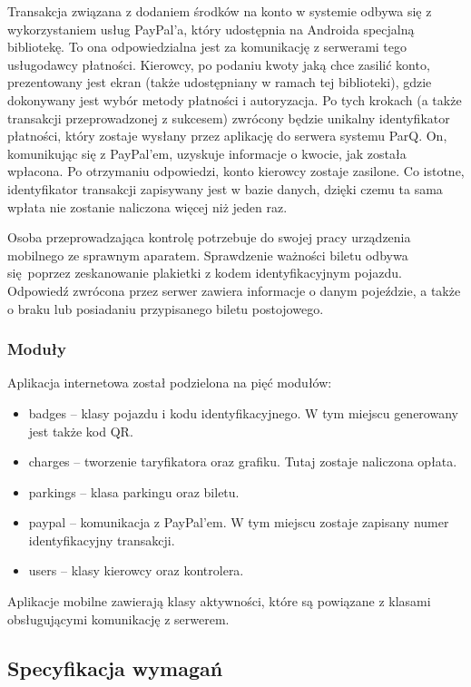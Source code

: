 Transakcja związana z dodaniem środków na konto w systemie odbywa się z wykorzystaniem usług PayPal'a, który udostępnia na Androida specjalną bibliotekę. To ona odpowiedzialna jest za komunikację z serwerami tego usługodawcy płatności. Kierowcy, po podaniu kwoty jaką chce zasilić konto, prezentowany jest ekran (także udostępniany w ramach tej biblioteki), gdzie dokonywany jest wybór metody płatności i autoryzacja. Po tych krokach (a także transakcji przeprowadzonej z sukcesem) zwrócony będzie unikalny identyfikator płatności, który zostaje wysłany przez aplikację do serwera systemu ParQ. On, komunikując się z PayPal'em, uzyskuje informacje o kwocie, jak została wpłacona. Po otrzymaniu odpowiedzi, konto kierowcy zostaje zasilone. Co istotne, identyfikator transakcji zapisywany jest w bazie danych, dzięki czemu ta sama wpłata nie zostanie naliczona więcej niż jeden raz.

Osoba przeprowadzająca kontrolę potrzebuje do swojej pracy urządzenia mobilnego ze sprawnym aparatem. Sprawdzenie ważności biletu odbywa się poprzez zeskanowanie plakietki z kodem identyfikacyjnym pojazdu. Odpowiedź zwrócona przez serwer zawiera informacje o danym pojeździe, a także o braku lub posiadaniu przypisanego biletu postojowego. 

\subsubsection*{Moduły}

Aplikacja internetowa został podzielona na pięć modułów:

\begin{itemize}
	\item badges -- klasy pojazdu i kodu identyfikacyjnego. W tym miejscu generowany jest także kod QR. 
	\item charges -- tworzenie taryfikatora oraz grafiku. Tutaj zostaje naliczona opłata.
	\item parkings -- klasa parkingu oraz biletu.
	\item paypal -- komunikacja z PayPal'em. W tym miejscu zostaje zapisany numer identyfikacyjny transakcji.
	\item users -- klasy kierowcy oraz kontrolera.
\end{itemize}

Aplikacje mobilne zawierają klasy aktywności, które są powiązane z klasami obsługującymi komunikację z serwerem.

\subsection{Specyfikacja wymagań}

